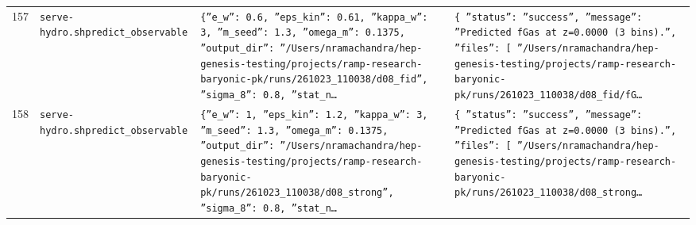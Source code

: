\documentclass[11pt,a4paper]{article}
\begin{document}
\begin{longtable}{@{}p{}p{}p{}p{}@{}}
157 & \texttt{serve-hydro.sh}\newline\texttt{predict\_\allowbreak{}observable} & \texttt{\{''e\_\allowbreak{}w'':\allowbreak{} 0.6,\allowbreak{} ''eps\_\allowbreak{}kin'':\allowbreak{} 0.61,\allowbreak{} ''kappa\_\allowbreak{}w'':\allowbreak{} 3,\allowbreak{} ''m\_\allowbreak{}seed'':\allowbreak{} 1.3,\allowbreak{} ''omega\_\allowbreak{}m'':\allowbreak{} 0.1375,\allowbreak{} ''output\_\allowbreak{}dir'':\allowbreak{} ''/\allowbreak{}Users/\allowbreak{}nramachandra/\allowbreak{}hep-genesis-testing/\allowbreak{}projects/\allowbreak{}ramp-research-baryonic-pk/\allowbreak{}runs/\allowbreak{}261023\_\allowbreak{}110038/\allowbreak{}d08\_\allowbreak{}fid'',\allowbreak{} ''sigma\_\allowbreak{}8'':\allowbreak{} 0.8,\allowbreak{} ''stat\_\allowbreak{}n\ldots{}\allowbreak{}} & \texttt{\{   ''status'':\allowbreak{} ''success'',\allowbreak{}   ''message'':\allowbreak{} ''Predicted fGas at z=\allowbreak{}0.0000 (3 bins)\allowbreak{}.'',\allowbreak{}   ''files'':\allowbreak{} [     ''/\allowbreak{}Users/\allowbreak{}nramachandra/\allowbreak{}hep-genesis-testing/\allowbreak{}projects/\allowbreak{}ramp-research-baryonic-pk/\allowbreak{}runs/\allowbreak{}261023\_\allowbreak{}110038/\allowbreak{}d08\_\allowbreak{}fid/\allowbreak{}fG\ldots{}\allowbreak{}} \\
158 & \texttt{serve-hydro.sh}\newline\texttt{predict\_\allowbreak{}observable} & \texttt{\{''e\_\allowbreak{}w'':\allowbreak{} 1,\allowbreak{} ''eps\_\allowbreak{}kin'':\allowbreak{} 1.2,\allowbreak{} ''kappa\_\allowbreak{}w'':\allowbreak{} 3,\allowbreak{} ''m\_\allowbreak{}seed'':\allowbreak{} 1.3,\allowbreak{} ''omega\_\allowbreak{}m'':\allowbreak{} 0.1375,\allowbreak{} ''output\_\allowbreak{}dir'':\allowbreak{} ''/\allowbreak{}Users/\allowbreak{}nramachandra/\allowbreak{}hep-genesis-testing/\allowbreak{}projects/\allowbreak{}ramp-research-baryonic-pk/\allowbreak{}runs/\allowbreak{}261023\_\allowbreak{}110038/\allowbreak{}d08\_\allowbreak{}strong'',\allowbreak{} ''sigma\_\allowbreak{}8'':\allowbreak{} 0.8,\allowbreak{} ''stat\_\allowbreak{}n\ldots{}\allowbreak{}} & \texttt{\{   ''status'':\allowbreak{} ''success'',\allowbreak{}   ''message'':\allowbreak{} ''Predicted fGas at z=\allowbreak{}0.0000 (3 bins)\allowbreak{}.'',\allowbreak{}   ''files'':\allowbreak{} [     ''/\allowbreak{}Users/\allowbreak{}nramachandra/\allowbreak{}hep-genesis-testing/\allowbreak{}projects/\allowbreak{}ramp-research-baryonic-pk/\allowbreak{}runs/\allowbreak{}261023\_\allowbreak{}110038/\allowbreak{}d08\_\allowbreak{}strong\ldots{}\allowbreak{}} \\

\end{longtable}
\end{document}
